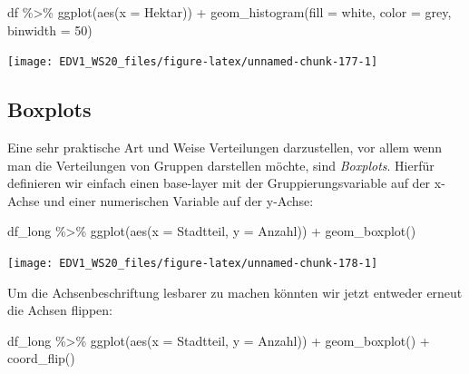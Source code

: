 \documentclass[
]{book}
\newenvironment{Shaded}{\begin{snugshade}}{\end{snugshade}}
\newcommand{\AttributeTok}[1]{\textcolor[rgb]{0.77,0.63,0.00}{#1}}
\newcommand{\DecValTok}[1]{\textcolor[rgb]{0.00,0.00,0.81}{#1}}
\newcommand{\FunctionTok}[1]{\textcolor[rgb]{0.00,0.00,0.00}{#1}}
\newcommand{\NormalTok}[1]{#1}
\newcommand{\SpecialCharTok}[1]{\textcolor[rgb]{0.00,0.00,0.00}{#1}}
\newcommand{\StringTok}[1]{\textcolor[rgb]{0.31,0.60,0.02}{#1}}
\begin{document}
\begin{Shaded}
\begin{Highlighting}[]
\NormalTok{df }\SpecialCharTok{\%\textgreater{}\%} 
  \FunctionTok{ggplot}\NormalTok{(}\FunctionTok{aes}\NormalTok{(}\AttributeTok{x =}\NormalTok{ Hektar)) }\SpecialCharTok{+}
  \FunctionTok{geom\_histogram}\NormalTok{(}\AttributeTok{fill =} \StringTok{\textquotesingle{}white\textquotesingle{}}\NormalTok{,}
                 \AttributeTok{color =} \StringTok{\textquotesingle{}grey\textquotesingle{}}\NormalTok{,}
                 \AttributeTok{binwidth =} \DecValTok{50}\NormalTok{)}
\end{Highlighting}
\end{Shaded}

\begin{center}\texttt{[image: EDV1\_WS20\_files/figure-latex/unnamed-chunk-177-1]} \end{center}

\hypertarget{boxplots}{%
\subsection{Boxplots}\label{boxplots}}

Eine sehr praktische Art und Weise Verteilungen darzustellen, vor allem wenn man die Verteilungen von Gruppen darstellen möchte, sind \emph{Boxplots}. Hierfür definieren wir einfach einen base-layer mit der Gruppierungsvariable auf der x-Achse und einer numerischen Variable auf der y-Achse:

\begin{Shaded}
\begin{Highlighting}[]
\NormalTok{df\_long }\SpecialCharTok{\%\textgreater{}\%} 
  \FunctionTok{ggplot}\NormalTok{(}\FunctionTok{aes}\NormalTok{(}\AttributeTok{x =}\NormalTok{ Stadtteil, }
             \AttributeTok{y =}\NormalTok{ Anzahl)) }\SpecialCharTok{+}
  \FunctionTok{geom\_boxplot}\NormalTok{()}
\end{Highlighting}
\end{Shaded}

\begin{center}\texttt{[image: EDV1\_WS20\_files/figure-latex/unnamed-chunk-178-1]} \end{center}

Um die Achsenbeschriftung lesbarer zu machen könnten wir jetzt entweder erneut die Achsen flippen:

\begin{Shaded}
\begin{Highlighting}[]
\NormalTok{df\_long }\SpecialCharTok{\%\textgreater{}\%} 
  \FunctionTok{ggplot}\NormalTok{(}\FunctionTok{aes}\NormalTok{(}\AttributeTok{x =}\NormalTok{ Stadtteil, }
             \AttributeTok{y =}\NormalTok{ Anzahl)) }\SpecialCharTok{+}
  \FunctionTok{geom\_boxplot}\NormalTok{() }\SpecialCharTok{+}
  \FunctionTok{coord\_flip}\NormalTok{()}
\end{Highlighting}
\end{Shaded}
\end{document}
